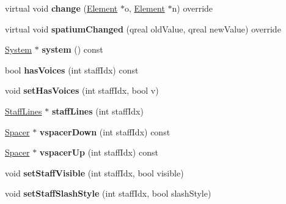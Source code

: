 \begin{DoxyCompactItemize}
\mbox{\label{class_ms_1_1_measure_ab4695ee08d2b769260f0589d94f48097}} 
virtual void {\bfseries change} (\hyperlink{class_ms_1_1_element}{Element} $\ast$o, \hyperlink{class_ms_1_1_element}{Element} $\ast$n) override
\item 
\mbox{\label{class_ms_1_1_measure_a9d807a2ebc9889d854dfbd3d243a45eb}} 
virtual void {\bfseries spatium\+Changed} (qreal old\+Value, qreal new\+Value) override
\item 
\mbox{\label{class_ms_1_1_measure_a9c4de13b592b3e0cc6a2398641da99ed}} 
\hyperlink{class_ms_1_1_system}{System} $\ast$ {\bfseries system} () const
\item 
\mbox{\label{class_ms_1_1_measure_a42a584c417b6f27bea251229a78e4566}} 
bool {\bfseries has\+Voices} (int staff\+Idx) const
\item 
\mbox{\label{class_ms_1_1_measure_ac1ee1ce30118d3a7aa965f297c76bd28}} 
void {\bfseries set\+Has\+Voices} (int staff\+Idx, bool v)
\item 
\mbox{\label{class_ms_1_1_measure_ac872216bf9760613e1f059f8531be5ad}} 
\hyperlink{class_ms_1_1_staff_lines}{Staff\+Lines} $\ast$ {\bfseries staff\+Lines} (int staff\+Idx)
\item 
\mbox{\label{class_ms_1_1_measure_a879b5d9349b7deb7f03df244ed55f6b8}} 
\hyperlink{class_ms_1_1_spacer}{Spacer} $\ast$ {\bfseries vspacer\+Down} (int staff\+Idx) const
\item 
\mbox{\label{class_ms_1_1_measure_a22789a30661e49d958abc30c0dce71ee}} 
\hyperlink{class_ms_1_1_spacer}{Spacer} $\ast$ {\bfseries vspacer\+Up} (int staff\+Idx) const
\item 
\mbox{\label{class_ms_1_1_measure_a9ef23d0042137cfc91aadab687a1c40c}} 
void {\bfseries set\+Staff\+Visible} (int staff\+Idx, bool visible)
\item 
\mbox{\label{class_ms_1_1_measure_a5a05ab876c3f875b9d488755ca29bdde}} 
void {\bfseries set\+Staff\+Slash\+Style} (int staff\+Idx, bool slash\+Style)

\end{DoxyCompactItemize}
